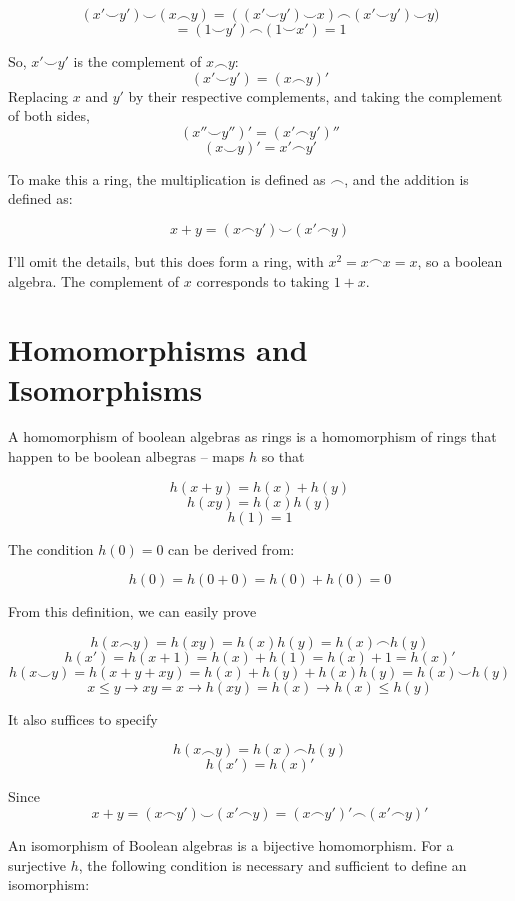 \documentclass{article}
\begin{document}
    \[(x' \smile y') \smile (x \frown y) = ((x' \smile y') \smile x) \frown (x'
    \smile y') \smile y)\]
    \[ = (1 \smile y') \frown (1 \smile x') = 1\]

    So, $x' \smile y'$ is the complement of $x \frown y$:
    \[(x' \smile y') = (x \frown y)'\]
    Replacing $x$ and $y'$ by their respective complements, and taking the
    complement of both sides,
    \[(x'' \smile y'')' = (x' \frown y')''\]
    \[(x \smile y)' = x' \frown y'\]

    To make this a ring, the multiplication is defined as $\frown$, and the
    addition is defined as:

    \[ x + y = (x \frown y') \smile (x' \frown y)\]

    I'll omit the details, but this does form a ring, with $x^2 = x \frown x =
    x$, so a boolean algebra. The complement of $x$ corresponds to taking $1+x$.


    \section{Homomorphisms and Isomorphisms}

    A homomorphism of boolean algebras as rings is a homomorphism of rings that
    happen to be boolean albegras -- maps $h$ so that

    \[h(x+y) = h(x) + h(y)\]
    \[h(xy) = h(x)h(y)\]
    \[h(1) = 1\]

    The condition $h(0) = 0$ can be derived from:

    \[h(0) = h(0+0) = h(0)+h(0) = 0\]

    From this definition, we can easily prove

    \[h(x \frown y) = h(xy) = h(x)h(y) = h(x) \frown h(y)\]
    \[h(x') = h(x+1) = h(x) + h(1) = h(x) + 1 = h(x)'\]
    \[h(x \smile y) = h(x + y + xy) = h(x) + h(y) + h(x)h(y) = h(x) \smile
    h(y)\]
    \[x \leq y \rightarrow xy = x \rightarrow h(xy) = h(x) \rightarrow h(x) \leq
    h(y)\]

    It also suffices to specify

    \[ h(x \frown y) = h(x) \frown h(y) \]
    \[h(x') = h(x)'\]

    Since
    \[x + y = (x \frown y') \smile (x' \frown y) = (x \frown y')' \frown (x'
    \frown y)'\]

    An isomorphism of Boolean algebras is a bijective homomorphism. For a
    surjective $h$, the following condition is necessary and sufficient to
    define an isomorphism:
\end{document}
